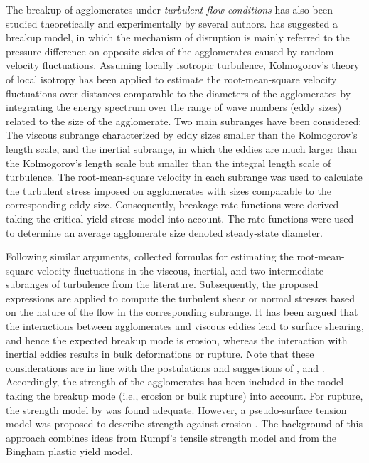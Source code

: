 The breakup of agglomerates under \emph{turbulent flow conditions} has
also been studied theoretically and experimentally by several authors.
\citet{thomas1964turbulent} has suggested a breakup model, in which
the mechanism of disruption is mainly referred to the pressure
difference on opposite sides of the agglomerates caused by random
velocity fluctuations. Assuming locally isotropic turbulence,
Kolmogorov's theory of local isotropy has been applied to estimate the
root-mean-square velocity fluctuations over distances comparable to
the diameters of the agglomerates by integrating the energy spectrum
over the range of wave numbers (eddy sizes) related to the size of the
agglomerate. Two main subranges have been considered: The viscous
subrange characterized by eddy sizes smaller than the Kolmogorov's
length scale, and the inertial subrange, in which the eddies are much
larger than the Kolmogorov's length scale but smaller than the
integral length scale of turbulence.  The root-mean-square velocity in
each subrange was used to calculate the turbulent stress imposed on
agglomerates with sizes comparable to the corresponding eddy
size. Consequently, breakage rate functions were derived taking the
critical yield stress model \citep{thomas1963transport} into
account. The rate functions were used to determine an average
agglomerate size denoted steady-state diameter.

Following similar arguments, \citet{neesse1987physikalische} collected
formulas for estimating the root-mean-square velocity fluctuations in
the viscous, inertial, and two intermediate subranges of turbulence
from the literature. Subsequently, the proposed expressions are
applied to compute the turbulent shear or normal stresses based on the
nature of the flow in the corresponding subrange. It has been argued
that the interactions between agglomerates and viscous eddies lead to
surface shearing, and hence the expected breakup mode is erosion,
whereas the interaction with inertial eddies results in bulk
deformations or rupture. Note that these considerations are in line
with the postulations and suggestions of \citet{gregory1989},
\citet{muhle1993coagulation} and \citet{yeung1997effect}.
Accordingly, the strength of the agglomerates has been included in the
model taking the breakup mode (i.e., erosion or bulk rupture) into
account. For rupture, the strength model by \citet{rumpf1962} was
found adequate. However, a pseudo-surface tension model was proposed
to describe strength against erosion \citep{neesse1987physikalische}.
The background of this approach combines ideas from Rumpf's tensile
strength model and from the Bingham plastic yield model.

